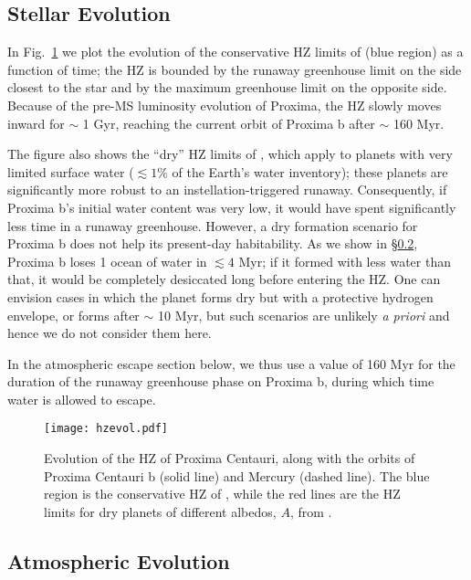 \documentclass[preprint,12pt]{aastex}
\begin{document}
\subsection{Stellar Evolution}
\label{sec:results:stellar}


In Fig.~\ref{fig:HZEvol} we plot the evolution of the conservative HZ
limits of \cite{Kopparapu13} (blue region) as a function of time; the
HZ is bounded by the runaway greenhouse limit on the side closest to
the star and by the maximum greenhouse limit on the opposite
side. Because of the pre-MS luminosity evolution of
Proxima, the HZ slowly moves inward for $\sim$ 1 Gyr, reaching the
current orbit of Proxima b after $\sim$ 160 Myr.

The figure also shows the ``dry'' HZ limits of \cite{Abe11}, which
apply to planets with very limited surface water ($\lesssim 1\%$ of
the Earth's water inventory); these planets are significantly more
robust to an instellation-triggered runaway. Consequently, if Proxima
b's initial water content was very low, it would have spent
significantly less time in a runaway greenhouse. However, a dry
formation scenario for Proxima b does not help its present-day
habitability. As we show in \S\ref{sec:results:atmesc}, Proxima b
loses 1 ocean of water in $\lesssim 4$ Myr; if it formed with less water
than that, it would be completely desiccated long before entering the
\cite{Abe11} HZ. One can envision cases in which the planet forms dry
but with a protective hydrogen envelope, or forms after $\sim$ 10 Myr,
but such scenarios are unlikely \emph{a priori} and hence we do not consider
them here.

In the atmospheric escape section below, we thus use a value of 160
Myr for the duration of the runaway greenhouse phase on Proxima b,
during which time water is allowed to escape.

\begin{figure}[ht]
\centering
\texttt{[image: hzevol.pdf]}
\caption{Evolution of the HZ of Proxima Centauri, along with the orbits of Proxima Centauri b (solid line) 
and Mercury (dashed line). The blue region is the conservative HZ of \cite{Kopparapu13}, while the red lines
are the HZ limits for dry planets of different albedos, $A$, from \cite{Abe11}.}
\label{fig:HZEvol}
\end{figure}

\subsection{Atmospheric Evolution}
\label{sec:results:atmesc}
\end{document}
